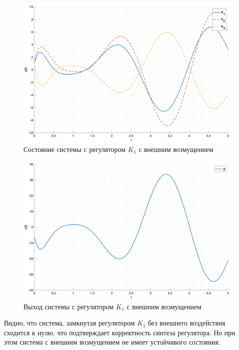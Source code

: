 \begin{figure}[ht!]
    \centering
    \includegraphics[width=\textwidth]{media/plots/K1_wf_x.png}
    \caption{Состояние системы с регулятором $K_1$ с внешним возмущением}
    \label{fig:K1_wf_x}
\end{figure}
\begin{figure}[ht!]
    \centering
    \includegraphics[width=\textwidth]{media/plots/K1_wf_z.png}
    \caption{Выход системы с регулятором $K_1$ с внешним возмущением}
    \label{fig:K1_wf_z}
\end{figure}
\FloatBarrier
Видно, что система, замкнутая регулятором $K_1$ без внешнего воздействия сходится к нулю, 
что подтверждает корректность синтеза регулятора. Но при этом система с внешним возмущением
не имеет устойчивого состояния.
\FloatBarrier

